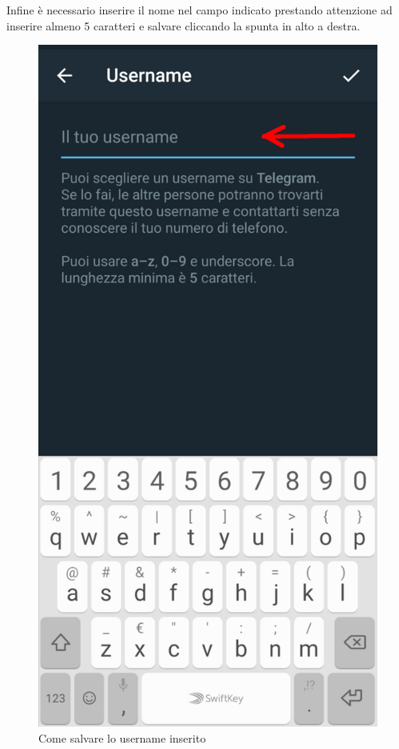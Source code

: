 		Infine è necessario inserire il nome nel campo indicato prestando attenzione ad inserire almeno 5 caratteri e salvare cliccando la spunta in alto a destra.
		\begin{figure}[H]
			\centering
			\includegraphics[scale=0.100]{res/images/telegram3.jpg}
			\caption{Come salvare lo username inserito}
			\label{Screenshot3}
		\end{figure}

